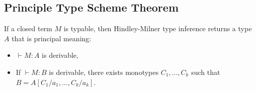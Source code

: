 \subsection{Principle Type Scheme Theorem}

If a closed term $M$ is typable, then Hindley-Milner type inference
returns a type $A$ that is principal meaning:
\begin{itemize}
    \item $\vdash M : A$ is derivable,
    \item If $\vdash M : B$ is derivable, there exists monotypes 
        $C_1, \ldots, C_k$ such that $B = A[C_1/a_1, \ldots, C_k/a_k]$.
\end{itemize}
